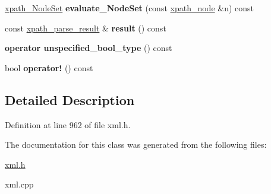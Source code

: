 \begin{DoxyCompactItemize}
\item 
\hypertarget{classphys_1_1xml_1_1xpath__query_a08eda816ba85929bd0cb5b038220cb12}{
\hyperlink{classphys_1_1xml_1_1xpath__NodeSet}{xpath\_\-NodeSet} {\bfseries evaluate\_\-NodeSet} (const \hyperlink{classphys_1_1xml_1_1xpath__node}{xpath\_\-node} \&n) const }
\label{de/d9e/classphys_1_1xml_1_1xpath__query_a08eda816ba85929bd0cb5b038220cb12}

\item 
\hypertarget{classphys_1_1xml_1_1xpath__query_a1b57c9d69fff49b94b03ad33132d8531}{
const \hyperlink{structphys_1_1xml_1_1xpath__parse__result}{xpath\_\-parse\_\-result} \& {\bfseries result} () const }
\label{de/d9e/classphys_1_1xml_1_1xpath__query_a1b57c9d69fff49b94b03ad33132d8531}

\item 
\hypertarget{classphys_1_1xml_1_1xpath__query_a97998963246521002d11ba405f8e6b32}{
{\bfseries operator unspecified\_\-bool\_\-type} () const }
\label{de/d9e/classphys_1_1xml_1_1xpath__query_a97998963246521002d11ba405f8e6b32}

\item 
\hypertarget{classphys_1_1xml_1_1xpath__query_ae06c5426b9e32143b1881cf12af50390}{
bool {\bfseries operator!} () const }
\label{de/d9e/classphys_1_1xml_1_1xpath__query_ae06c5426b9e32143b1881cf12af50390}

\end{DoxyCompactItemize}


\subsection{Detailed Description}


Definition at line 962 of file xml.h.



The documentation for this class was generated from the following files:\begin{DoxyCompactItemize}
\item 
\hyperlink{xml_8h}{xml.h}\item 
xml.cpp\end{DoxyCompactItemize}
